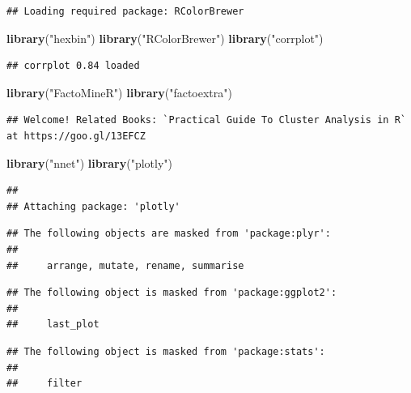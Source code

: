 \documentclass[]{article}
\newenvironment{Shaded}{\begin{snugshade}}{\end{snugshade}}
\newcommand{\KeywordTok}[1]{\textcolor[rgb]{0.13,0.29,0.53}{\textbf{#1}}}
\newcommand{\NormalTok}[1]{#1}
\newcommand{\StringTok}[1]{\textcolor[rgb]{0.31,0.60,0.02}{#1}}
\begin{document}
\begin{verbatim}
## Loading required package: RColorBrewer
\end{verbatim}

\begin{Shaded}
\begin{Highlighting}[]
\KeywordTok{library}\NormalTok{(}\StringTok{"hexbin"}\NormalTok{)}
\KeywordTok{library}\NormalTok{(}\StringTok{"RColorBrewer"}\NormalTok{)}
\KeywordTok{library}\NormalTok{(}\StringTok{"corrplot"}\NormalTok{)}
\end{Highlighting}
\end{Shaded}

\begin{verbatim}
## corrplot 0.84 loaded
\end{verbatim}

\begin{Shaded}
\begin{Highlighting}[]
\KeywordTok{library}\NormalTok{(}\StringTok{"FactoMineR"}\NormalTok{)}
\KeywordTok{library}\NormalTok{(}\StringTok{"factoextra"}\NormalTok{)}
\end{Highlighting}
\end{Shaded}

\begin{verbatim}
## Welcome! Related Books: `Practical Guide To Cluster Analysis in R` at https://goo.gl/13EFCZ
\end{verbatim}

\begin{Shaded}
\begin{Highlighting}[]
\KeywordTok{library}\NormalTok{(}\StringTok{"nnet"}\NormalTok{)}
\KeywordTok{library}\NormalTok{(}\StringTok{"plotly"}\NormalTok{)}
\end{Highlighting}
\end{Shaded}

\begin{verbatim}
## 
## Attaching package: 'plotly'
\end{verbatim}

\begin{verbatim}
## The following objects are masked from 'package:plyr':
## 
##     arrange, mutate, rename, summarise
\end{verbatim}

\begin{verbatim}
## The following object is masked from 'package:ggplot2':
## 
##     last_plot
\end{verbatim}

\begin{verbatim}
## The following object is masked from 'package:stats':
## 
##     filter
\end{verbatim}
\end{document}
